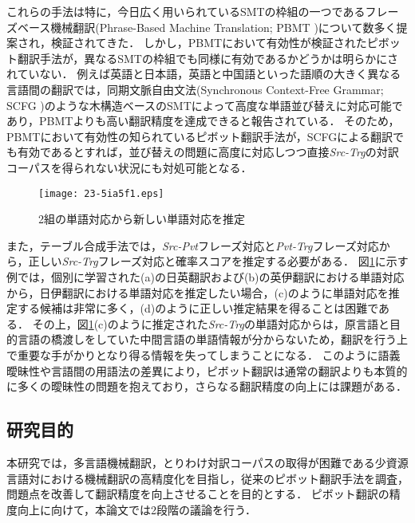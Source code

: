 \documentclass[japanese]{jnlp_1.4}
\begin{document}
これらの手法は特に，今日広く用いられているSMTの枠組の一つであるフレーズベース機械翻訳(Phrase-Based Machine Translation; PBMT \cite{koehn03})について数多く提案され，検証されてきた．
しかし，PBMTにおいて有効性が検証されたピボット翻訳手法が，異なるSMTの枠組でも同様に有効であるかどうかは明らかにされていない．
例えば英語と日本語，英語と中国語といった語順の大きく異なる言語間の翻訳では，同期文脈自由文法(Synchronous Context-Free Grammar; SCFG \cite{chiang07})のような木構造ベースのSMTによって高度な単語並び替えに対応可能であり，PBMTよりも高い翻訳精度を達成できると報告されている．
そのため，PBMTにおいて有効性の知られているピボット翻訳手法が，SCFGによる翻訳でも有効であるとすれば，並び替えの問題に高度に対応しつつ直接\textit{Src-Trg}の対訳コーパスを得られない状況にも対処可能となる．

\begin{figure}[t]
\begin{center}
\texttt{[image: 23-5ia5f1.eps]}
\end{center}
\caption{2組の単語対応から新しい単語対応を推定}
\label{fig:align-estimation}
\end{figure}

また，テーブル合成手法では，\textit{Src-Pvt}フレーズ対応と\textit{Pvt-Trg}フレーズ対応から，正しい\textit{Src-Trg}フレーズ対応と確率スコアを推定する必要がある．
図\ref{fig:align-estimation}に示す例では，個別に学習された(a)の日英翻訳および(b)の英伊翻訳における単語対応から，日伊翻訳における単語対応を推定したい場合，(c)のように単語対応を推定する候補は非常に多く，(d)のように正しい推定結果を得ることは困難である．
その上，図\ref{fig:align-estimation}(c)のように推定された\textit{Src-Trg}の単語対応からは，原言語と目的言語の橋渡しをしていた中間言語の単語情報が分からないため，翻訳を行う上で重要な手がかりとなり得る情報を失ってしまうことになる．
このように語義曖昧性や言語間の用語法の差異により，ピボット翻訳は通常の翻訳よりも本質的に多くの曖昧性の問題を抱えており，さらなる翻訳精度の向上には課題がある．


\subsection{研究目的}
\label{sec:purpose}

本研究では，多言語機械翻訳，とりわけ対訳コーパスの取得が困難である少資源言語対における機械翻訳の高精度化を目指し，従来のピボット翻訳手法を調査，問題点を改善して翻訳精度を向上させることを目的とする．
ピボット翻訳の精度向上に向けて，本論文では2段階の議論を行う．
\end{document}

